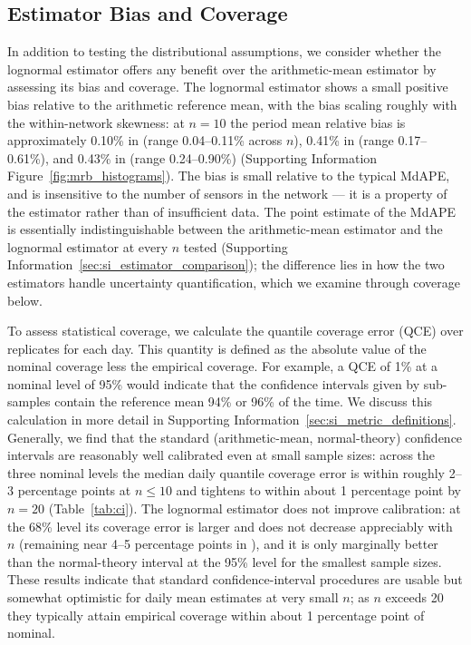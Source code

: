 \documentclass[12pt]{article}
\theoremstyle{remark}
\newcommand{\city}[1]{\capitalisewords{\MakeLowercase{#1}}}
\begin{document}
\subsection{Estimator Bias and Coverage}\label{sec:bias_coverage}
In addition to testing the distributional assumptions, we consider whether the lognormal estimator offers any benefit over the arithmetic-mean estimator by assessing its bias and coverage. The lognormal estimator shows a small positive bias relative to the arithmetic reference mean, with the bias scaling roughly with the within-network skewness: at $n=10$ the period mean relative bias is approximately 0.10\% in \city{Chicago} (range 0.04--0.11\% across $n$), 0.41\% in \city{Dhaka} (range 0.17--0.61\%), and 0.43\% in \city{Lucknow} (range 0.24--0.90\%) (Supporting Information Figure~\ref{fig:mrb_histograms}). The bias is small relative to the typical MdAPE, and is insensitive to the number of sensors in the network --- it is a property of the estimator rather than of insufficient data. The point estimate of the MdAPE is essentially indistinguishable between the arithmetic-mean estimator and the lognormal estimator at every $n$ tested (Supporting Information~\ref{sec:si_estimator_comparison}); the difference lies in how the two estimators handle uncertainty quantification, which we examine through coverage below.

To assess statistical coverage, we calculate the quantile coverage error (QCE) over replicates for each day. This quantity is defined as the absolute value of the nominal coverage less the empirical coverage. For example, a QCE of 1\% at a nominal level of 95\% would indicate that the confidence intervals given by sub-samples contain the reference mean 94\% or 96\% of the time. We discuss this calculation in more detail in Supporting Information~\ref{sec:si_metric_definitions}. Generally, we find that the standard (arithmetic-mean, normal-theory) confidence intervals are reasonably well calibrated even at small sample sizes: across the three nominal levels the median daily quantile coverage error is within roughly 2--3 percentage points at $n \leq 10$ and tightens to within about 1 percentage point by $n=20$ (Table~\ref{tab:ci}). The lognormal estimator does not improve calibration: at the 68\% level its coverage error is larger and does not decrease appreciably with $n$ (remaining near 4--5 percentage points in \city{Dhaka}), and it is only marginally better than the normal-theory interval at the 95\% level for the smallest sample sizes. These results indicate that standard confidence-interval procedures are usable but somewhat optimistic for daily mean estimates at very small $n$; as $n$ exceeds 20 they typically attain empirical coverage within about 1 percentage point of nominal.
\end{document}
